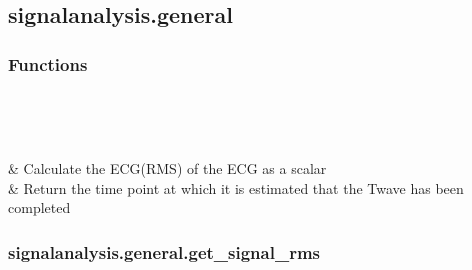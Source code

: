 \documentclass[letterpaper,10pt,english]{sphinxmanual}
\begin{document}
\subsection{signalanalysis.general}
\label{\detokenize{_autosummary/signalanalysis.general:module-signalanalysis.general}}\label{\detokenize{_autosummary/signalanalysis.general:signalanalysis-general}}\label{\detokenize{_autosummary/signalanalysis.general::doc}}\subsubsection*{Functions}


\begin{savenotes}\sphinxatlongtablestart\begin{longtable}[c]{}
\hline

\endfirsthead

%
{}\\
\hline

\endhead

\hline
{}\\
\endfoot

\endlastfoot

\sphinxAtStartPar
{\hyperref[\detokenize{_autosummary/signalanalysis.general.get_signal_rms:signalanalysis.general.get_signal_rms}]{}}
&
\sphinxAtStartPar
Calculate the ECG(RMS) of the ECG as a scalar
\\
\hline
\sphinxAtStartPar
{\hyperref[\detokenize{_autosummary/signalanalysis.general.get_twave_end:signalanalysis.general.get_twave_end}]{}}
&
\sphinxAtStartPar
Return the time point at which it is estimated that the T\sphinxhyphen{}wave has been completed
\\
\hline
\end{longtable}\sphinxatlongtableend\end{savenotes}


\subsubsection{signalanalysis.general.get\_signal\_rms}
\label{\detokenize{_autosummary/signalanalysis.general.get_signal_rms:signalanalysis-general-get-signal-rms}}\label{\detokenize{_autosummary/signalanalysis.general.get_signal_rms::doc}}
\end{document}
